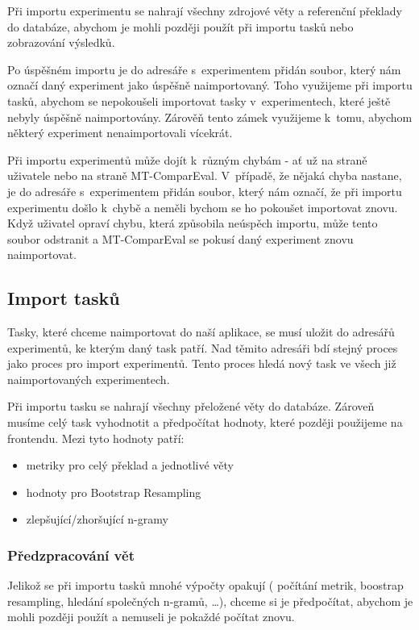 Při importu experimentu se nahrají všechny zdrojové věty
  a referenční překlady do databáze,
  abychom je mohli později použít při importu tasků
  nebo zobrazování výsledků.

Po úspěšném importu je do adresáře s~experimentem přidán soubor,
  který nám označí daný experiment jako úspěšně naimportovaný.
Toho využijeme při importu tasků,
  abychom se nepokoušeli importovat tasky v~experimentech,
  které ještě nebyly úspěšně naimportovány.
Zárověň tento zámek využijeme k~tomu,
  abychom některý experiment nenaimportovali vícekrát.

Při importu experimentů může dojít k~různým chybám -
  ať už na straně uživatele nebo na straně MT-ComparEval.
V~případě, že nějaká chyba nastane,
  je do adresáře s~experimentem přidán soubor,
  který nám označí,
  že při importu experimentu došlo k~chybě
  a neměli bychom se ho pokoušet importovat znovu.
Když uživatel opraví chybu,
  která způsobila neúspěch importu,
  může tento soubor odstranit
  a MT-ComparEval se pokusí daný experiment znovu naimportovat.

\subsection{Import tasků}
Tasky, které chceme naimportovat do naší aplikace,
  se musí uložit do adresářů experimentů,
  ke kterým daný task patří.
Nad těmito adresáři bdí stejný proces
  jako proces pro import experimentů.
Tento proces hledá nový task ve všech již 
  naimportovaných experimentech.

Při importu tasku se nahrají všechny přeložené věty do databáze.
Zároveň musíme celý task vyhodnotit a předpočítat hodnoty,
  které později použijeme na frontendu.
Mezi tyto hodnoty patří:
\begin{itemize}
	\item metriky pro celý překlad a jednotlivé věty
	\item hodnoty pro Bootstrap Resampling 
	\item zlepšující/zhoršující \mbox{n-gramy}
\end{itemize}

\subsubsection{Předzpracování vět}
Jelikož se při importu tasků mnohé výpočty opakují
  ( počítání metrik, boostrap resampling, hledání společných \mbox{n-gramů}, \dots ),
  chceme si je předpočítat,
  abychom je mohli později použít a nemuseli je pokaždé počítat znovu.

